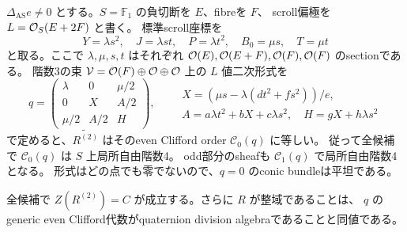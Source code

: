 \begin{theorem}
\label{thm:h3-order2-global-conic-bundle}
$\Delta_{\mathrm{AS}}e\ne0$ とする。$S=\mathbb F_1$ の負切断を $E$、fibreを $F$、
scroll偏極を $L=\mathcal O_S(E+2F)$ と書く。
標準scroll座標を
\[
 Y=\lambda s^2,\quad J=\lambda st,\quad P=\lambda t^2,\quad
 B_0=\mu s,\quad T=\mu t
\]
と取る。ここで $\lambda,\mu,s,t$ はそれぞれ
$\mathcal O(E),\mathcal O(E+F),\mathcal O(F),\mathcal O(F)$ のsectionである。
階数3の束 $\mathcal V=\mathcal O(F)\oplus\mathcal O\oplus\mathcal O$ 上の $L$ 値二次形式を
\begin{equation}\label{eq:h3-order2-global-conic-matrix}
 q=\begin{pmatrix}
 \lambda&0&\mu/2\\0&X&A/2\\\mu/2&A/2&H
 \end{pmatrix},\qquad
 \begin{gathered}
 X=(\mu s-\lambda(dt^2+fs^2))/e,\\
 A=a\lambda t^2+bX+c\lambda s^2,\quad H=gX+h\lambda s^2
 \end{gathered}
\end{equation}
で定めると、$\widetilde{R^{(2)}}$ はそのeven Clifford order $\mathcal C_0(q)$ に等しい。
従って全候補で $\mathcal C_0(q)$ は $S$ 上局所自由階数4。
odd部分のsheafも $\mathcal C_1(q)$ で局所自由階数4となる。
形式はどの点でも零でないので、$q=0$ のconic bundleは平坦である。

全候補で $Z(R^{(2)})=C$ が成立する。さらに $R$ が整域であることは、
$q$ のgeneric even Clifford代数がquaternion division algebraであることと同値である。
\end{theorem}
